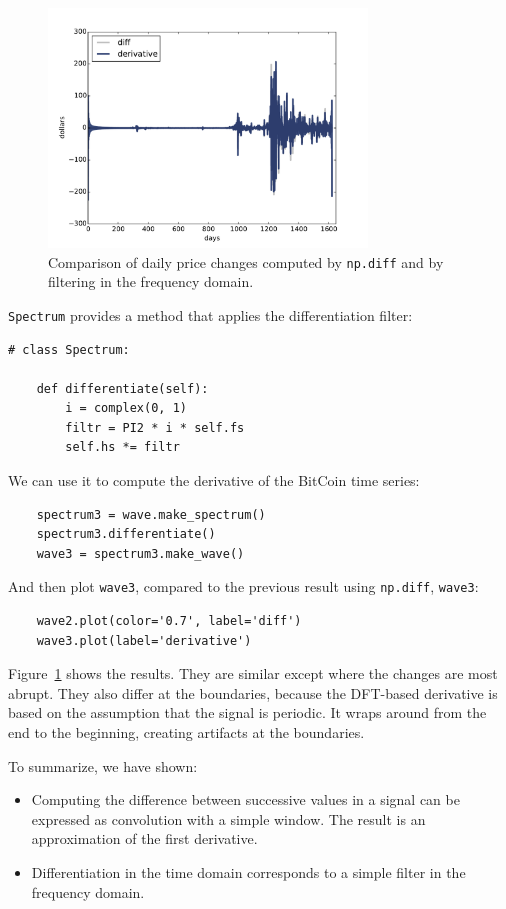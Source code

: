 \documentclass[12pt]{book}
\begin{document}
\begin{figure}
\centerline{\includegraphics[height=2.5in]{figs/systems4.pdf}}
\caption{Comparison of daily price changes computed by
{\tt np.diff} and by filtering in the frequency domain.}
\label{fig.diff_int4}
\end{figure}

{\tt Spectrum} provides a method that applies the differentiation
filter:

\begin{verbatim}
# class Spectrum:

    def differentiate(self):
        i = complex(0, 1)
        filtr = PI2 * i * self.fs
        self.hs *= filtr
\end{verbatim}

We can use it to compute the derivative of the BitCoin time series:

\begin{verbatim}
    spectrum3 = wave.make_spectrum()
    spectrum3.differentiate()
    wave3 = spectrum3.make_wave()
\end{verbatim}

And then plot {\tt wave3}, compared to the previous result
using {\tt np.diff}, {\tt wave3}:

\begin{verbatim}
    wave2.plot(color='0.7', label='diff')
    wave3.plot(label='derivative')
\end{verbatim}

Figure~\ref{fig.diff_int4} shows the results.  They are similar except
where the changes are most abrupt.  They also differ at the
boundaries, because the DFT-based derivative is based on the
assumption that the signal is periodic.  It wraps around from the end
to the beginning, creating artifacts at the boundaries.

To summarize, we have shown:

\begin{itemize} 

\item Computing the difference between successive values in a signal
  can be expressed as convolution with a simple window.  The result is
  an approximation of the first derivative.

\item Differentiation in the time domain corresponds to a simple
  filter in the frequency domain.

\end{itemize}
\end{document}
